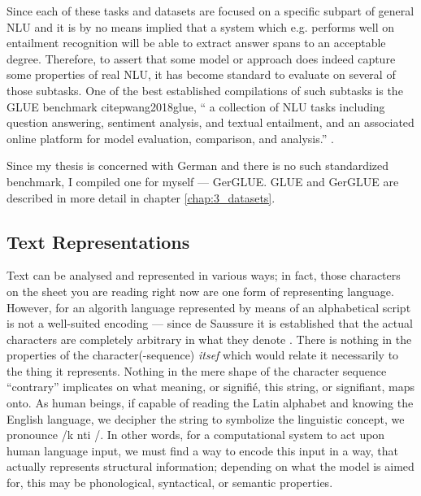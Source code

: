 Since each of these tasks and datasets are focused on a specific subpart of general NLU and
it is by no means implied that a system which e.g. performs well on entailment recognition
will be able to extract answer spans to an acceptable degree. Therefore, to assert that some
model or approach does indeed capture some properties of real NLU, it has become standard
to evaluate on several of those subtasks. One of the best established compilations of such
subtasks is the GLUE benchmark citep{wang2018glue}, `` a collection of NLU tasks including
question answering, sentiment analysis, and textual entailment, and an associated online
platform for model evaluation, comparison, and analysis.'' \citep{wang2018glue}.

Since my thesis is concerned with German and there is no such standardized benchmark, I
compiled one for myself --- GerGLUE. GLUE and GerGLUE are described in more detail in
chapter \ref{chap:3_datasets}.


\subsection{Text Representations}

Text can be analysed and represented in various ways; in fact, those characters on the
sheet you are reading right now are one form of representing language. However, for an
algorith language represented by means of an alphabetical script is not a well-suited
encoding --- since de Saussure it is established that the actual characters are completely
arbitrary in what they denote \citep{de1989cours}. There is nothing in the properties of
the character(-sequence) \emph{itsef} which would relate it necessarily to the thing it
represents. Nothing in the mere shape of the character sequence ``contrary'' implicates
on what meaning, or signifié, this string, or signifiant, maps onto. As human beings, if
capable of reading the Latin alphabet and knowing the English language, we decipher the
string to symbolize the linguistic concept, we pronounce /\textprimstress k\textscripta
nt\textturnr \textschwa \textturnr i /. In other words, for a computational system to act
upon human language input, we must find a way to encode this input in a way, that actually
represents structural information; depending on what the model is aimed for, this may be
phonological, syntactical, or semantic properties.


